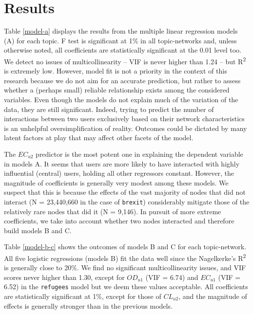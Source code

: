 \section{Results}\label{Results}\thispagestyle{SectionFirstPage} %
Table \vref{model-a} displays the results from the multiple linear regression models (A) for each topic. F test is significant at 1\% in all topic-networks and, unless otherwise noted, all coefficients are statistically significant at the 0.01 level too. We detect no issues of multicollinearity  – VIF is never higher than 1.24 – but R\textsuperscript{2} is extremely low. However, model fit is not a priority in the context of this research because we do not aim for an accurate prediction, but rather to assess whether a (perhaps small) reliable relationship exists among the considered variables. Even though the models do not explain much of the variation of the data, they are still significant. Indeed, trying to predict the number of interactions between two users exclusively based on their network characteristics is an unhelpful oversimplification of reality. Outcomes could be dictated by many latent factors at play that may affect other facets of the model.

The $EC_{u2}$ predictor is the most potent one in explaining the dependent variable in models A. It seems that users are more likely to have interacted with highly influential (central) users, holding all other regressors constant. However, the magnitude of coefficients is generally very modest among these models. We suspect that this is because the effects of the vast majority of nodes that did not interact (N = 23,440,660 in the case of \texttt{brexit}) considerably mitigate those of the relatively rare nodes that did it (N = 9,146). In pursuit of more extreme coefficients, we take into account whether two nodes interacted and therefore build models B and C.

Table \vref{model-b-c} shows the outcomes of models B and C for each topic-network.
All five logistic regressions (models B) fit the data well since the Nagelkerke's R\textsuperscript{2} is generally close to 20\%. We find no significant multicollinearity issues, and VIF scores never higher than 1.30, except for $OD_{u1}$ (VIF = 6.74) and $EC_{u1}$ (VIF = 6.52) in the \texttt{refugees} model but we deem these values acceptable. All coefficients are statistically significant at 1\%, except for those of $CL_{u2}$, and the magnitude of effects is generally stronger than in the previous models.

